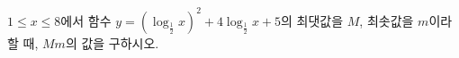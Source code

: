$1\le x\le 8$에서 함수 $y=(\log_{\frac{1}{2}} x)^2+4\log_{\frac{1}{2}} x+5$의 최댓값을 $M$, 최솟값을 $m$이라 할 때, $Mm$의 값을 구하시오.

